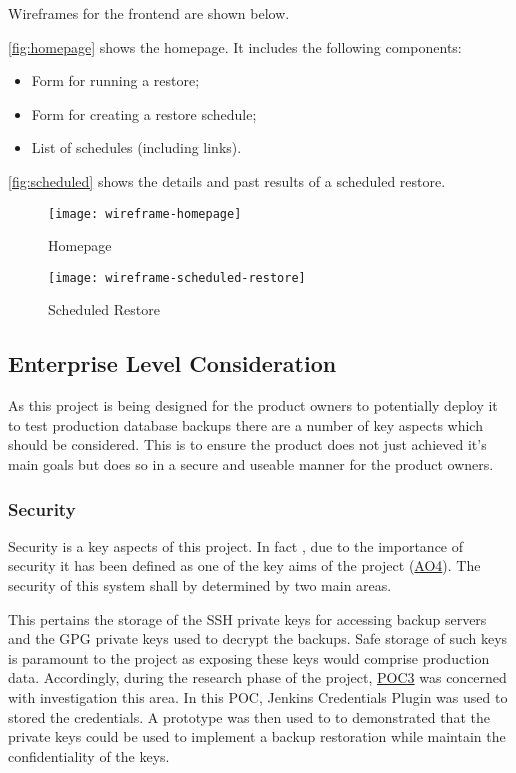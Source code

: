 		Wireframes for the frontend are shown below. 
        
        \autoref{fig:homepage} shows the homepage. It includes the following components:
		\begin{itemize}
			\item Form for running a restore;
			\item Form for creating a restore schedule;
			\item List of schedules (including links).
		\end{itemize}
		\autoref{fig:scheduled} shows the details and past results of a scheduled restore.
		
		
		\begin{figure}[H]
			\setlength{\belowcaptionskip}{15pt plus 3pt minus 2pt}
			\caption{Homepage}
			\centering
			\texttt{[image: wireframe-homepage]}
			\label{fig:homepage}
		\end{figure}
		
		\begin{figure}[H]
			\setlength{\belowcaptionskip}{15pt plus 3pt minus 2pt}
			\caption{Scheduled Restore}
			\centering
			\texttt{[image: wireframe-scheduled-restore]}
			\label{fig:scheduled}
		\end{figure}

	\subsection{Enterprise Level Consideration}
  As this project is being designed for the product owners to potentially deploy it to test production database backups there are a number of key aspects which should be considered. This is to ensure the product does not just achieved it's main goals but does so in a secure and useable manner for the product owners.
  
  \subsubsection{Security}
  Security is a key aspects of this project. In fact , due to the importance of security it has been defined as one of the key aims of the project (\hyperref[ao4]{AO4}). The security of this system shall by determined by two main areas.
  
  This pertains the storage of the SSH private keys for accessing backup servers and the GPG private keys used to decrypt the backups. Safe storage of such keys is paramount to the project as exposing these keys would comprise production data. Accordingly, during the research phase of the project, \hyperref[poc3]{POC3} was concerned with investigation this area.
  In this POC, Jenkins Credentials Plugin was used to stored the credentials. A prototype was then used to to demonstrated that the private keys could be used to implement a backup restoration while maintain the confidentiality of the keys.
  
